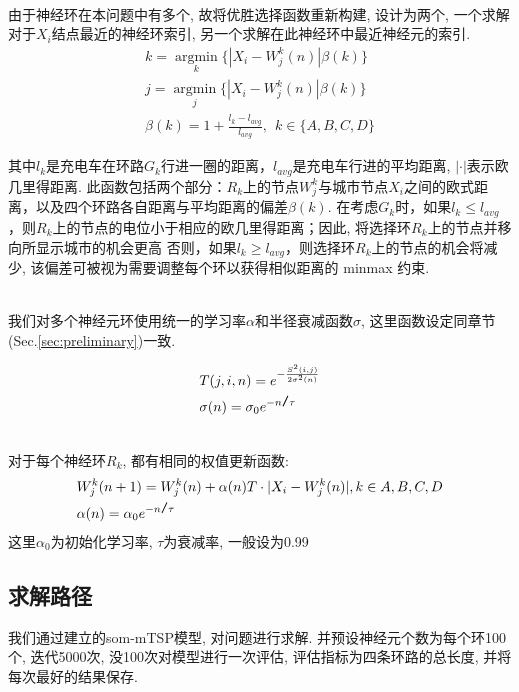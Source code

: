 \\

由于神经环在本问题中有多个, 故将优胜选择函数重新构建, 设计为两个, 一个求解对于$X_i$结点最近的神经环索引, 另一个求解在此神经环中最近神经元的索引.
\begin{eqnarray}
    k = \mathop{argmin}\limits_{k}\{ |X_i-W^k_j(n)|\beta(k) \}\\
   \nonumber
    j = \mathop{argmin}\limits_{j}\{ |X_i-W^k_j(n)|\beta(k) \} \\
    \nonumber
    \beta(k) = 1+\frac{l_k - l_{avg}}{l_{avg}},~~ k \in \{A,B,C,D\}
\end{eqnarray}

其中$l_k$是充电车在环路$G_k$行进一圈的距离，$l_{avg}$是充电车行进的平均距离, $|\cdot|$表示欧几里得距离. 此函数包括两个部分：$R_k$上的节点$W^k_j$与城市节点$X_i$之间的欧式距离，以及四个环路各自距离与平均距离的偏差$\beta(k)$. 在考虑$G_k$时，如果$l_k \leq l_{avg}$，则$R_k$上的节点的电位小于相应的欧几里得距离；因此, 将选择环$R_k$上的节点并移向所显示城市的机会更高 否则，如果$l_k \geq l_{avg}$，则选择环$R_k$上的节点的机会将减少, 该偏差可被视为需要调整每个环以获得相似距离的 minmax 约束\cite{som-mtsp2}.


\\

我们对多个神经元环使用统一的学习率$\alpha$和半径衰减函数$\sigma$, 这里函数设定同章节(Sec.\ref{sec:preliminary})一致.

\begin{eqnarray}
    \quad & T(j,i,n) = e^{ - \frac{S^2(i,j)}{2\sigma^2(n)}}&\\
    \quad &\sigma(n) = \sigma_0e^{- n\verb|/|\tau}&
  \end{eqnarray}

\\

对于每个神经环$R_k$, 都有相同的权值更新函数:
\begin{eqnarray}
    \quad &W_j^k(n+1) =  W_j^k(n)+\alpha(n) T \cdot |X_i - W_j^k(n)|, k \in{A,B,C,D}&\\
    \nonumber
    \quad & \alpha(n) = \alpha_0e^{- n  \verb|/| \tau}&
\end{eqnarray}
这里$\alpha_0$为初始化学习率, $\tau$为衰减率, 一般设为0.99
\subsection{求解路径}
我们通过建立的som-mTSP模型, 对问题进行求解. 并预设神经元个数为每个环100个, 迭代5000次, 没100次对模型进行一次评估, 评估指标为四条环路的总长度, 并将每次最好的结果保存.

